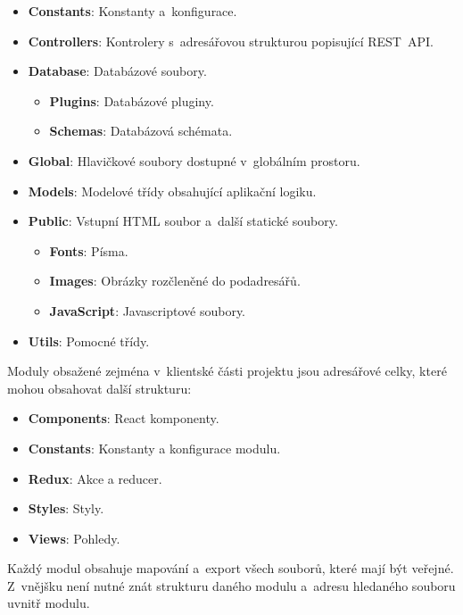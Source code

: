 \documentclass[a4paper,12pt]{article}
\begin{document}
\begin{itemize}
\begin{itemize}
\begin{itemize}
\end{itemize} 

\item \textbf{Constants}: Konstanty a~konfigurace.
\item \textbf{Controllers}: Kontrolery s~adresářovou strukturou popisující REST~API.
\item \textbf{Database}: Databázové soubory.

\begin{itemize}
\item \textbf{Plugins}: Databázové pluginy.
\item \textbf{Schemas}: Databázová schémata.
\end{itemize} 

\item \textbf{Global}: Hlavičkové soubory dostupné v~globálním prostoru.
\item \textbf{Models}: Modelové třídy obsahující aplikační logiku.
\item \textbf{Public}: Vstupní HTML soubor a~další statické soubory.

\begin{itemize}
\item \textbf{Fonts}: Písma.
\item \textbf{Images}: Obrázky rozčleněné do podadresářů.
\item \textbf{JavaScript}: Javascriptové soubory.
\end{itemize} 

\item \textbf{Utils}:  Pomocné třídy.
\end{itemize} 

\end{itemize} 

Moduly obsažené zejména v~klientské části projektu jsou adresářové celky, které mohou obsahovat další strukturu:

\begin{itemize}
\item \textbf{Components}: React komponenty.
\item \textbf{Constants}: Konstanty a konfigurace modulu.
\item \textbf{Redux}: Akce a reducer.
\item \textbf{Styles}: Styly.
\item \textbf{Views}: Pohledy.
\end{itemize} 

Každý modul obsahuje mapování a~export všech souborů, které mají být veřejné. Z~vnějšku není nutné znát strukturu daného modulu a~adresu hledaného souboru uvnitř modulu.
\end{document}
